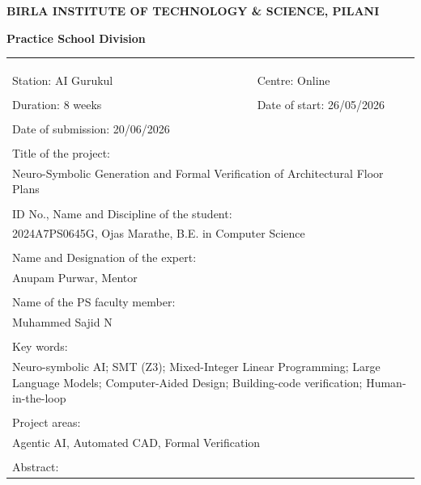 \documentclass{book}
\begin{document}
\thispagestyle{empty}
\centerline{\bf BIRLA INSTITUTE OF TECHNOLOGY \& SCIENCE, PILANI}
\vspace*{0.2cm}
\centerline{\bf Practice School Division}
\vspace*{0.3cm}
{\bf
	\begin{tabular}{p{6cm}l}
		& \\ & \\ & \\
		Station: AI Gurukul & \hspace*{2cm} Centre: Online \\ %
		& \\
		Duration: 8 weeks &\hspace*{2cm} Date of start: 26/05/2026 \\ %
		& \\
		Date of submission: 20/06/2026 & {} \\
		& \\
		Title of the project: & \\
		\multicolumn{2}{p{14cm}}{Neuro-Symbolic Generation and Formal Verification of Architectural Floor Plans} \\
		& \\
		ID No., Name and Discipline of the student: & \\
		\multicolumn{2}{p{14cm}}{2024A7PS0645G, Ojas Marathe, B.E. in Computer Science} \\ %
		& \\
		Name and Designation of the expert: & \\
		\multicolumn{2}{p{14cm}}{Anupam Purwar, Mentor} \\ %
		& \\
		Name of the PS faculty member: & \\
		\multicolumn{2}{p{14cm}}{Muhammed Sajid N} \\ %
		& \\
		Key words: & \\
		\multicolumn{2}{p{14cm}}{Neuro-symbolic AI; SMT (Z3); Mixed-Integer Linear Programming; Large Language Models; Computer-Aided Design; Building-code verification; Human-in-the-loop} \\
		& \\
		Project areas: & \\
		\multicolumn{2}{p{14cm}}{Agentic AI, Automated CAD, Formal Verification} \\
		& \\
		Abstract: & \\

\end{tabular}}
\end{document}
